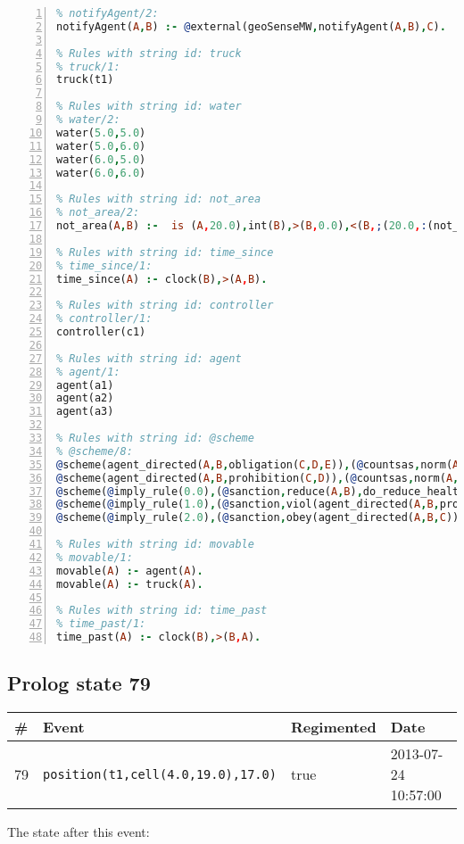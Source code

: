 \documentclass[11pt]{article}\usepackage[utf8]{inputenc}\usepackage{geometry}
\begin{document}
\begin{lstlisting}[language=Prolog, numbers=left]
% Rules with string id: notifyAgent
% notifyAgent/2:
notifyAgent(A,B) :- @external(geoSenseMW,notifyAgent(A,B),C).

% Rules with string id: truck
% truck/1:
truck(t1)

% Rules with string id: water
% water/2:
water(5.0,5.0)
water(5.0,6.0)
water(6.0,5.0)
water(6.0,6.0)

% Rules with string id: not_area
% not_area/2:
not_area(A,B) :-  is (A,20.0),int(B),>(B,0.0),<(B,;(20.0,:(not_area(A,B), is (-(B),20.0)))),int(A),>(A,0.0),<(A,;(20.0,:(area(A,B),-(int(A))))),int(B),>(A,0.0),>(B,0.0),<(A,21.0),<(B,21.0).

% Rules with string id: time_since
% time_since/1:
time_since(A) :- clock(B),>(A,B).

% Rules with string id: controller
% controller/1:
controller(c1)

% Rules with string id: agent
% agent/1:
agent(a1)
agent(a2)
agent(a3)

% Rules with string id: @scheme
% @scheme/8:
@scheme(agent_directed(A,B,obligation(C,D,E)),(@countsas,norm(A,B,F,obligation(C,D,E)),F),false,(listTrue(C)),(time_past(D)),false,[plus(viol(agent_directed(A,B,obligation(C,D,E))))|[]],[plus(obey(agent_directed(A,B,obligation(C,D,E))))|[]])
@scheme(agent_directed(A,B,prohibition(C,D)),(@countsas,norm(A,B,E,prohibition(C,D)),E),(listTrue(C)),false,(false),false,[plus(viol(agent_directed(A,B,prohibition(C,D))))|[]],[plus(obey(agent_directed(A,B,prohibition(C,D))))|[]])
@scheme(@imply_rule(0.0),(@sanction,reduce(A,B),do_reduce_health(A,B),notifyAgent(A,changed(status))),true,false,false,false,[min(reduce(A,B))|[]],[])
@scheme(@imply_rule(1.0),(@sanction,viol(agent_directed(A,B,prohibition(C,D))),do_sanction(D)),true,false,false,false,[min(viol(agent_directed(A,B,prohibition(C,D))))|[]],[])
@scheme(@imply_rule(2.0),(@sanction,obey(agent_directed(A,B,C))),true,false,false,false,[min(obey(agent_directed(A,B,C)))|[]],[])

% Rules with string id: movable
% movable/1:
movable(A) :- agent(A).
movable(A) :- truck(A).

% Rules with string id: time_past
% time_past/1:
time_past(A) :- clock(B),>(B,A).

\end{lstlisting}
\clearpage 
\subsection{Prolog state 79}
\begin{table}[ht]
\centering 
\begin{tabular}{l l l l} 
\textbf{\#} & \textbf{Event} & \textbf{Regimented} & \textbf{Date} \\ [0.5ex] 
\hline
79&\texttt{position(t1,cell(4.0,19.0),17.0)}&true&2013-07-24 10:57:00\\ [1ex] \hline\end{tabular}
\end{table}
The state after this event:
\end{document}
